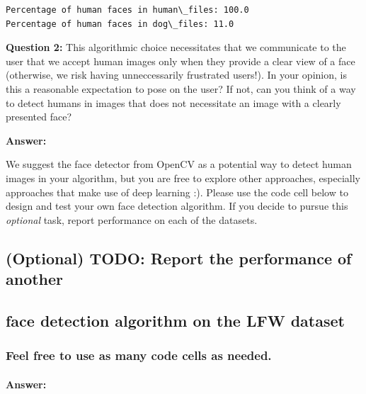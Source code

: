 \documentclass[11pt]{article}
\begin{document}
    \begin{Verbatim}[commandchars=\\\{\}]
Percentage of human faces in human\_files: 100.0
Percentage of human faces in dog\_files: 11.0

    \end{Verbatim}

    \textbf{Question 2:} This algorithmic choice necessitates that we
communicate to the user that we accept human images only when they
provide a clear view of a face (otherwise, we risk having unneccessarily
frustrated users!). In your opinion, is this a reasonable expectation to
pose on the user? If not, can you think of a way to detect humans in
images that does not necessitate an image with a clearly presented face?

\textbf{Answer:}

We suggest the face detector from OpenCV as a potential way to detect
human images in your algorithm, but you are free to explore other
approaches, especially approaches that make use of deep learning :).
Please use the code cell below to design and test your own face
detection algorithm. If you decide to pursue this \emph{optional} task,
report performance on each of the datasets.

    \hypertarget{optional-todo-report-the-performance-of-another}{%
\subsection{(Optional) TODO: Report the performance of
another}\label{optional-todo-report-the-performance-of-another}}

\hypertarget{face-detection-algorithm-on-the-lfw-dataset}{%
\subsection{face detection algorithm on the LFW
dataset}\label{face-detection-algorithm-on-the-lfw-dataset}}

\hypertarget{feel-free-to-use-as-many-code-cells-as-needed.}{%
\subsubsection{Feel free to use as many code cells as
needed.}\label{feel-free-to-use-as-many-code-cells-as-needed.}}

    \hypertarget{answer}{%
\paragraph{Answer:}\label{answer}}
\end{document}
